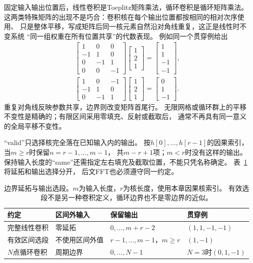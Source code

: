 固定输入输出位置后，线性卷积是Toeplitz矩阵乘法，循环卷积是循环矩阵乘法。
这两类特殊矩阵的出现不是巧合：卷积核在每个输出位置都按相同的相对次序使用、
只是整体平移，写成矩阵后同一核元素自然沿对角线重复，这正是线性时不变系统
“同一组权重在所有位置共享”的代数表现。
例如同一个贯穿例给出
\begin{gather*}
  \begin{bmatrix}
    1&0&0\\-1&1&0\\0&-1&1\\0&0&-1
  \end{bmatrix}
  \begin{bmatrix}1\\2\\1\end{bmatrix}
  =\begin{bmatrix}1\\1\\-1\\-1\end{bmatrix},\\
  \begin{bmatrix}1&0&-1\\-1&1&0\\0&-1&1\end{bmatrix}
  \begin{bmatrix}1\\2\\1\end{bmatrix}
  =\begin{bmatrix}0\\1\\-1\end{bmatrix}.
\end{gather*}
重复对角线反映参数共享，边界则改变矩阵首尾行。
无限网格或循环群上的平移不变性是精确的；有限区间采用零填充、反射或截取后，
通常不再具有同一意义的全局平移不变性。

“valid”只选择核完全落在已知输入内的输出。
按$h[0],\ldots,h[r-1]$的因果索引，当$m\geq r$时保留$n=r-1,\ldots,m-1$，
共$m-r+1$项；$m<r$时没有这样的输出。
保持输入长度的“same”还需指定左右填充及截取位置，不能只凭名称确定。
表~\ref{tab:signal-boundary-conventions}将延拓和输出选择分开，
后文FFT也必须遵守同一约定。
\begin{table}[!htb]
  \centering
  \begin{tabularx}{\linewidth}{lXXX}
    \toprule
    约定 & 区间外输入 & 保留输出 & 贯穿例\\
    \midrule
    完整线性卷积 & 零延拓 & $0,\ldots,m+r-2$ & $(1,1,-1,-1)$\\
    有效区间选段 & 不使用区间外值 & $r-1,\ldots,m-1$，$m\geq r$ & $(1,-1)$\\
    $N$点循环卷积 & 周期边界 & $0,\ldots,N-1$ & $N=3$时$(0,1,-1)$\\
    \bottomrule
  \end{tabularx}
  \caption{边界延拓与输出选段。$m$为输入长度，$r$为核长度，使用本章因果核索引。
  有效选段不是另一种卷积定义，循环边界也不是零边界的近似。}
  \label{tab:signal-boundary-conventions}
\end{table}

